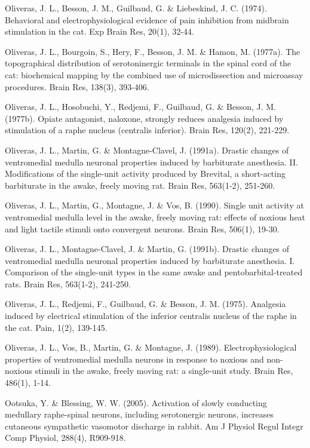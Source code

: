 \documentclass[a4paper,12pt,twoside]{report}
\begin{document}
\begin{singlespacing}
\begin{footnotesize}
Oliveras, J. L., Besson, J. M., Guilbaud, G. \& Liebeskind, J. C. (1974). Behavioral and electrophysiological evidence of pain inhibition from midbrain stimulation in the cat. Exp Brain Res, 20(1), 32-44.

Oliveras, J. L., Bourgoin, S., Hery, F., Besson, J. M. \& Hamon, M. (1977a). The topographical distribution of serotoninergic terminals in the spinal cord of the cat: biochemical mapping by the combined use of microdissection and microassay procedures. Brain Res, 138(3), 393-406.

Oliveras, J. L., Hosobuchi, Y., Redjemi, F., Guilbaud, G. \& Besson, J. M. (1977b). Opiate antagonist, naloxone, strongly reduces analgesia induced by stimulation of a raphe nucleus (centralis inferior). Brain Res, 120(2), 221-229.

Oliveras, J. L., Martin, G. \& Montagne-Clavel, J. (1991a). Drastic changes of ventromedial medulla neuronal properties induced by barbiturate anesthesia. II. Modifications of the single-unit activity produced by Brevital, a short-acting barbiturate in the awake, freely moving rat. Brain Res, 563(1-2), 251-260.

Oliveras, J. L., Martin, G., Montagne, J. \& Vos, B. (1990). Single unit activity at ventromedial medulla level in the awake, freely moving rat: effects of noxious heat and light tactile stimuli onto convergent neurons. Brain Res, 506(1), 19-30.

Oliveras, J. L., Montagne-Clavel, J. \& Martin, G. (1991b). Drastic changes of ventromedial medulla neuronal properties induced by barbiturate anesthesia. I. Comparison of the single-unit types in the same awake and pentobarbital-treated rats. Brain Res, 563(1-2), 241-250.

Oliveras, J. L., Redjemi, F., Guilbaud, G. \& Besson, J. M. (1975). Analgesia induced by electrical stimulation of the inferior centralis nucleus of the raphe in the cat. Pain, 1(2), 139-145.

Oliveras, J. L., Vos, B., Martin, G. \& Montagne, J. (1989). Electrophysiological properties of ventromedial medulla neurons in response to noxious and non-noxious stimuli in the awake, freely moving rat: a single-unit study. Brain Res, 486(1), 1-14.

Ootsuka, Y. \& Blessing, W. W. (2005). Activation of slowly conducting medullary raphe-spinal neurons, including serotonergic neurons, increases cutaneous sympathetic vasomotor discharge in rabbit. Am J Physiol Regul Integr Comp Physiol, 288(4), R909-918.


\end{footnotesize}
\end{singlespacing}
\end{document}
